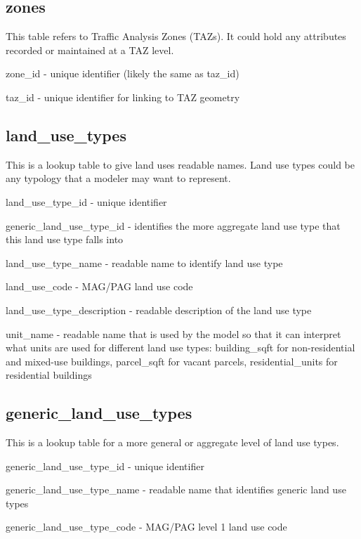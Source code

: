 \subsection{zones} 

This table refers to Traffic Analysis Zones (TAZs). It could hold any attributes recorded or maintained at a TAZ level.

\begin{description}
\item zone\_id - unique identifier (likely the same as taz\_id)
\item taz\_id - unique identifier for linking to TAZ geometry 
\end{description}


\subsection{land\_use\_types} 

This is a lookup table to give land uses readable names. Land use types could be any typology that a modeler may want to represent.

\begin{description}
\item land\_use\_type\_id - unique identifier
\item generic\_land\_use\_type\_id - identifies the more aggregate land use type that this land use type falls into
\item land\_use\_type\_name - readable name to identify land use type
\item land\_use\_code - MAG/PAG land use code
\item land\_use\_type\_description - readable description of the land use type
\item unit\_name - readable name that is used by the model so that it can interpret what units are used for different land use types: building\_sqft for non-residential and mixed-use buildings, parcel\_sqft for vacant parcels, residential\_units for residential buildings 
\end{description}

\subsection{generic\_land\_use\_types} 

This is a lookup table for a more general or aggregate level of land use types.

\begin{description}
\item generic\_land\_use\_type\_id - unique identifier
\item generic\_land\_use\_type\_name - readable name that identifies generic land use types
\item generic\_land\_use\_type\_code - MAG/PAG level 1 land use code 
\end{description}

